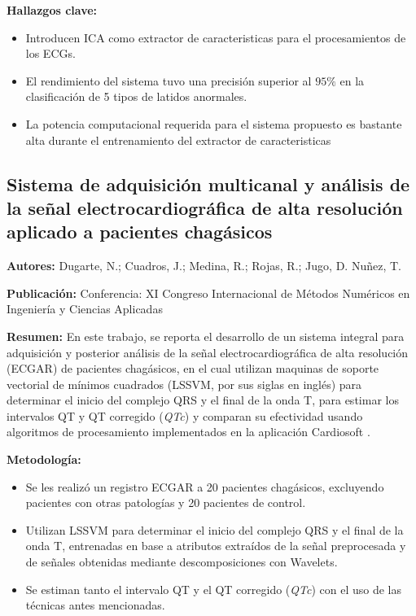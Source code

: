 \documentclass[spanish,11pt,letterpaper,oneside]{memoir}
\begin{document}
\textbf{Hallazgos clave:} 
\begin{itemize}
	\item Introducen ICA como extractor de caracteristicas para el procesamientos de los ECGs.
	\item El rendimiento del sistema tuvo una precisión superior al $95\%$ en la clasificación de 5 tipos de latidos anormales.
	\item La potencia computacional requerida para el sistema propuesto es bastante alta durante el entrenamiento del extractor de caracteristicas
\end{itemize}

\subsection{Sistema de adquisición multicanal y análisis de la señal electrocardiográfica de alta resolución aplicado a pacientes chagásicos \cite{Dugarte11}}
\textbf{Autores:} Dugarte, N.; Cuadros, J.; Medina, R.; Rojas, R.; Jugo, D. Nuñez, T.

\textbf{Publicación:} Conferencia: XI Congreso Internacional de Métodos Numéricos en Ingeniería y Ciencias Aplicadas

\textbf{Resumen:} En este trabajo, se reporta el desarrollo de un sistema integral para adquisición y posterior análisis de la señal electrocardiográfica de alta resolución (ECGAR) de pacientes chagásicos, en el cual utilizan maquinas de soporte vectorial de mínimos cuadrados (LSSVM, por sus siglas en inglés) para determinar el inicio del complejo QRS y el final de la onda T, para estimar los intervalos QT y QT corregido (\textit{QTc}) y comparan su efectividad usando algoritmos de procesamiento implementados en la aplicación Cardiosoft \cite{cardiosoft}. 

\textbf{Metodología:}
\begin{itemize}
	\item Se les realizó un registro ECGAR a 20 pacientes chagásicos, excluyendo pacientes con otras patologías y 20 pacientes de control.
	\item Utilizan LSSVM para determinar el inicio del complejo QRS y el final de la onda T, entrenadas en base a atributos extraídos de la señal preprocesada y de señales obtenidas mediante descomposiciones con Wavelets.
	\item Se estiman tanto el intervalo QT y el QT corregido (\textit{QTc}) con el uso de las técnicas antes mencionadas.
\end{itemize}
\end{document}
